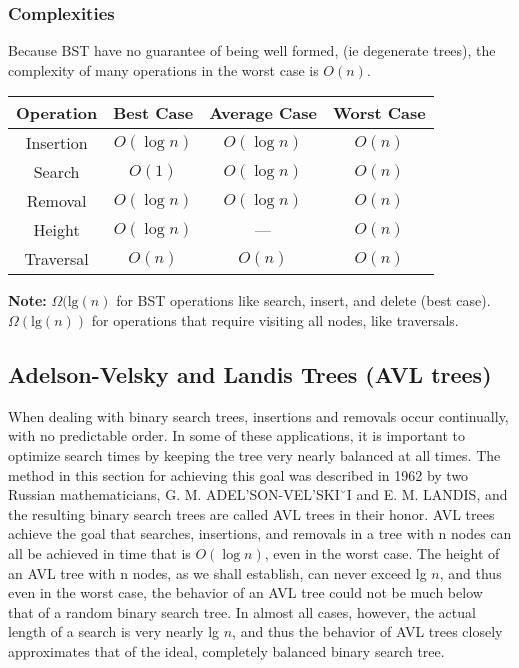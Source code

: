 \documentclass{report}
\begin{document}
    \pagebreak 
    \subsubsection{Complexities}
    \bigbreak \noindent 
    Because BST have no guarantee of being well formed, (ie degenerate trees), the complexity of many operations in the worst case is $O(n)$.
    \bigbreak \noindent 
    \begin{center}
        \begin{tabular}{|c|c|c|c|}
            \hline
            \textbf{Operation} & \textbf{Best Case} & \textbf{Average Case} & \textbf{Worst Case} \\ \hline
            Insertion & \( O(\log n) \) & \( O(\log n) \) & \( O(n) \) \\ \hline
            Search & \( O(1) \) & \( O(\log n) \) & \( O(n) \) \\ \hline
            Removal & \( O(\log n) \) & \( O(\log n) \) & \( O(n) \) \\ \hline
            Height & \( O(\log n) \) & --- & \( O(n) \) \\ \hline
            Traversal & \( O(n) \) & \( O(n) \) & \( O(n) \) \\ \hline
        \end{tabular}
    \end{center}
    \bigbreak \noindent 
    \textbf{Note:} $\Omega(\text{lg}(n)$ for BST operations like search, insert, and delete (best case).
    \bigbreak \noindent 
    $\Omega(\text{lg}(n))$ for operations that require visiting all nodes, like traversals.








    \pagebreak 
    \subsection{Adelson-Velsky and Landis Trees (AVL trees)}
    \bigbreak \noindent 
    When dealing with binary search trees, insertions and removals occur continually, with no predictable order. In some of these applications, it is important to optimize search times by keeping the tree very nearly balanced at all times. The method in this section for achieving this goal was described in 1962 by two Russian mathematicians, G. M. ADEL’SON-VEL’SKI˘I and E. M. LANDIS, and the resulting binary search trees are called AVL trees in their honor.
    \bigbreak \noindent 
    AVL trees achieve the goal that searches, insertions, and removals in a tree
with n nodes can all be achieved in time that is $O(\log n)$, even in the worst case.
The height of an AVL tree with n nodes, as we shall establish, can never exceed
lg $n$, and thus even in the worst case, the behavior of an AVL tree could not
be much below that of a random binary search tree. In almost all cases, however,
the actual length of a search is very nearly lg $n$, and thus the behavior of AVL trees
closely approximates that of the ideal, completely balanced binary search tree.
\bigbreak \noindent 
\end{document}

